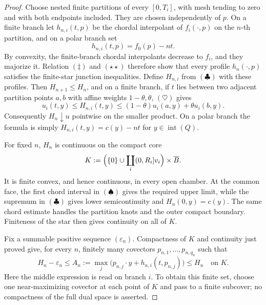 \begin{proof}
Choose nested finite partitions of every \([0,T_i]\), with mesh tending to
zero and with both endpoints included.  They are chosen independently of
\(p\).  On a finite branch let \(h_{n,i}(t,p)\) be the chordal interpolant
of \(f_i(\cdot,p)\) on the \(n\)-th partition, and on a polar branch set
\[
                         h_{n,i}(t,p)=f_0(p)-nt.
\]
By convexity, the finite-branch chordal interpolants decrease to \(f_i\),
and they majorize it.  Relation \((\ddagger)\) and
\((\star\star)\) therefore show that every profile \(h_n(\cdot,p)\)
satisfies the finite-star junction inequalities.  Define \(H_{n,i}\) from
\((\clubsuit)\) with these profiles.  Then \(H_{n+1}\leq H_n\), and on a
finite branch, if \(t\) lies between two adjacent partition points \(a,b\)
with affine weights \(1-\theta,\theta\), \((\heartsuit)\) gives
\[
 u_i(t,y)\leq H_{n,i}(t,y)
 \leq(1-\theta)u_i(a,y)+\theta u_i(b,y).
 \tag{\(\spadesuit\)}
\]
Consequently \(H_n\downarrow u\) pointwise on the smaller product.  On a
polar branch the formula is simply \(H_{n,i}(t,y)=c(y)-nt\) for
\(y\in\operatorname{int}(Q)\).

For fixed \(n\), \(H_n\) is continuous on the compact core
\[
 K:=\Bigl(\{0\}\cup\coprod_i(0,R_i]v_i\Bigr)\times\overline B.
\]
It is finite convex, and hence continuous, in every open chamber.  At the
common face, the first chord interval in \((\spadesuit)\) gives the required
upper limit, while the supremum in \((\clubsuit)\) gives lower
semicontinuity and \(H_n(0,y)=c(y)\).  The same chord estimate handles the
partition knots and the outer compact boundary.  Finiteness of the star then
gives continuity on all of \(K\).

Fix a summable positive sequence \((\varepsilon_n)\).  Compactness of \(K\)
and continuity just proved give, for every \(n\), finitely many covectors
\(p_{n,1},\ldots,p_{n,q_n}\) such that
\[
 H_n-\varepsilon_n
 \leq A_n:=\max_j\bigl(p_{n,j}\mathbin\cdot y+
                    h_{n,i}(t,p_{n,j})\bigr)
 \leq H_n
 \quad\text{on }K.
 \tag{\(\diamondsuit\)}
\]
Here the middle expression is read on branch \(i\).  To obtain this finite
set, choose one near-maximizing covector at each point of \(K\) and pass to
a finite subcover; no compactness of the full dual space is asserted.


\end{proof}
